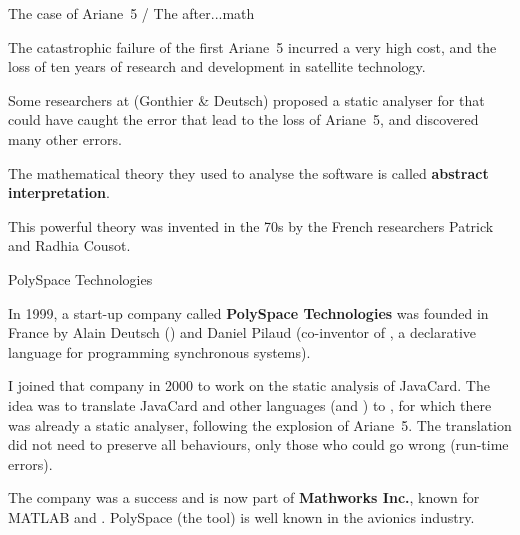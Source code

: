 \documentclass[compress,dvips,xcolor={dvipsnames},t]{beamer}
\begin{document}
%
\begin{frame}{The case of Ariane~5 / The after...math}

  The catastrophic failure of the first Ariane~5 incurred a very high
  cost, and the loss of ten years of research and development in
  satellite technology.

  \bigskip

  Some researchers at \Inria (Gonthier \& Deutsch) proposed a static
  analyser for \Ada that could have caught the error that lead to the
  loss of Ariane~5, and discovered many other errors.

  \bigskip

  The mathematical theory they used to analyse the software is called
  \textbf{abstract interpretation}.

  \bigskip

  This powerful theory was invented in the 70s by the French
  researchers Patrick and Radhia Cousot.

\end{frame}

%
\begin{frame}{PolySpace Technologies}

  In 1999, a start-up company called \textbf{PolySpace Technologies}
  was founded in France by Alain Deutsch (\Inria) and Daniel Pilaud
  (co\hyp{}inventor of \Lustre, a declarative language for programming
  synchronous systems).

  \bigskip

  I joined that company in 2000 to work on the static analysis of
  JavaCard. The idea was to translate JavaCard and other languages
  (\Clang and \Cpp) to \Ada, for which there was already a static
  analyser, following the explosion of Ariane~5. The translation did
  not need to preserve all behaviours, only those who could go wrong
  (run\hyp{}time errors).

  \bigskip

  The company was a success and is now part of \textbf{Mathworks
    Inc.}, known for MATLAB and \Simulink. PolySpace (the tool) is
  well known in the avionics industry.

\end{frame}
\end{document}
